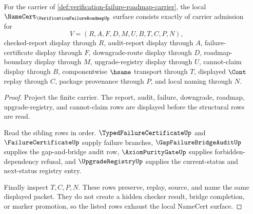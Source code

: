 \begin{theorem}
\label{thm:verification-failure-roadmap-namecert-obligations}
For the carrier of \autoref{def:verification-failure-roadmap-carrier}, the local $\NameCert_{\VerificationFailureRoadmapUp}$ surface consists exactly of carrier admission for
$$
V=(R,A,F,D,M,U,B,T,C,P,N),
$$
checked-report display through $R$, audit-report display through $A$, failure-certificate display through $F$, downgrade-route display through $D$, roadmap-boundary display through $M$, upgrade-registry display through $U$, cannot-claim display through $B$, componentwise $\hsame$ transport through $T$, displayed $\Cont$ replay through $C$, package provenance through $P$, and local naming through $N$.
\end{theorem}
\begin{proof}
Project the finite carrier. The report, audit, failure, downgrade, roadmap, upgrade-registry, and cannot-claim rows are displayed before the structural rows are read.

Read the sibling rows in order. $\TypedFailureCertificateUp$ and $\FailureCertificateUp$ supply failure branches, $\GapFailureBridgeAuditUp$ supplies the gap-and-bridge audit row, $\AxiomPurityGateUp$ supplies forbidden-dependency refusal, and $\UpgradeRegistryUp$ supplies the current-status and next-status registry entry.

Finally inspect $T,C,P,N$. These rows preserve, replay, source, and name the same displayed packet. They do not create a hidden checker result, bridge completion, or marker promotion, so the listed rows exhaust the local NameCert surface.
\end{proof}


